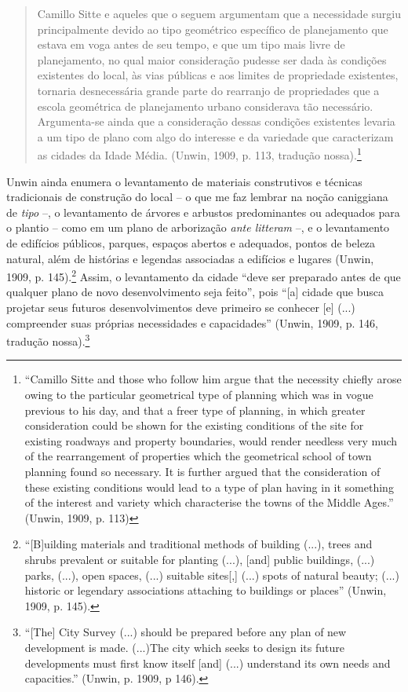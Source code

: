 \documentclass[12pt, a4paper]{book} %
\begin{document}
        \begin{quotation}
            Camillo Sitte e aqueles que o seguem argumentam que a necessidade surgiu principalmente devido ao tipo geométrico específico de planejamento que estava em voga antes de seu tempo, e que um tipo mais livre de planejamento, no qual maior consideração pudesse ser dada às condições existentes do local, às vias públicas e aos limites de propriedade existentes, tornaria desnecessária grande parte do rearranjo de propriedades que a escola geométrica de planejamento urbano considerava tão necessário. Argumenta-se ainda que a consideração dessas condições existentes levaria a um tipo de plano com algo do interesse e da variedade que caracterizam as cidades da Idade Média. (Unwin, 1909, p. 113, tradução nossa).\footnote[34]{``Camillo Sitte and those who follow him argue that the necessity chiefly arose owing to the particular geometrical type of planning which was in vogue previous to his day, and that a freer type of planning, in which greater consideration could be shown for the existing conditions of the site for existing roadways and property boundaries, would render needless very much of the rearrangement of properties which the geometrical school of town planning found so necessary. It is further argued that the consideration of these existing conditions would lead to a type of plan having in it something of the interest and variety which characterise the towns of the Middle Ages.'' (Unwin, 1909, p. 113)}
        \end{quotation}

        Unwin ainda enumera o levantamento de materiais construtivos e técnicas tradicionais de construção do local – o que me faz lembrar na noção caniggiana de \textit{tipo} –, o levantamento de árvores e arbustos predominantes ou adequados para o plantio – como em um plano de arborização \textit{ante litteram} –, e o levantamento de edifícios públicos, parques, espaços abertos e adequados, pontos de beleza natural, além de histórias e legendas associadas a edifícios e lugares (Unwin, 1909, p. 145).\footnote[35]{``[B]uilding materials and traditional methods of building (...), trees and shrubs prevalent or suitable for planting (...), [and] public buildings, (...) parks, (...), open spaces, (...) suitable sites[,] (...) spots of natural beauty; (...) historic or legendary associations attaching to buildings or places'' (Unwin, 1909, p. 145).} Assim, o levantamento da cidade ``deve ser preparado antes de que qualquer plano de novo desenvolvimento seja feito'', pois ``[a] cidade que busca projetar seus futuros desenvolvimentos deve primeiro se conhecer [e] (...) compreender suas próprias necessidades e capacidades'' (Unwin, 1909, p. 146, tradução nossa).\footnote[36]{``[The] City Survey (...) should be prepared before any plan of new development is made. (...)The city which seeks to design its future developments must first know itself [and] (...) understand its own needs and capacities.'' (Unwin, p. 1909, p 146).}
\end{document}
